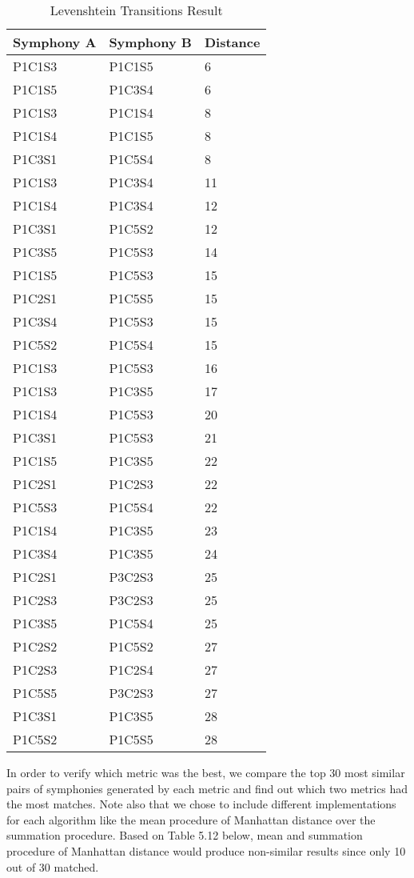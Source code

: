 \begin{longtable}{|l|l|l|}
\caption{Levenshtein Transitions Result}
\label{my-label}\\
\hline
Symphony A & Symphony B & Distance \\ \hline
\endfirsthead
%
\endhead
%
P1C1S3 & P1C1S5 & 6 \\ \hline
P1C1S5 & P1C3S4 & 6 \\ \hline
P1C1S3 & P1C1S4 & 8 \\ \hline
P1C1S4 & P1C1S5 & 8 \\ \hline
P1C3S1 & P1C5S4 & 8 \\ \hline
P1C1S3 & P1C3S4 & 11 \\ \hline
P1C1S4 & P1C3S4 & 12 \\ \hline
P1C3S1 & P1C5S2 & 12 \\ \hline
P1C3S5 & P1C5S3 & 14 \\ \hline
P1C1S5 & P1C5S3 & 15 \\ \hline
P1C2S1 & P1C5S5 & 15 \\ \hline
P1C3S4 & P1C5S3 & 15 \\ \hline
P1C5S2 & P1C5S4 & 15 \\ \hline
P1C1S3 & P1C5S3 & 16 \\ \hline
P1C1S3 & P1C3S5 & 17 \\ \hline
P1C1S4 & P1C5S3 & 20 \\ \hline
P1C3S1 & P1C5S3 & 21 \\ \hline
P1C1S5 & P1C3S5 & 22 \\ \hline
P1C2S1 & P1C2S3 & 22 \\ \hline
P1C5S3 & P1C5S4 & 22 \\ \hline
P1C1S4 & P1C3S5 & 23 \\ \hline
P1C3S4 & P1C3S5 & 24 \\ \hline
P1C2S1 & P3C2S3 & 25 \\ \hline
P1C2S3 & P3C2S3 & 25 \\ \hline
P1C3S5 & P1C5S4 & 25 \\ \hline
P1C2S2 & P1C5S2 & 27 \\ \hline
P1C2S3 & P1C2S4 & 27 \\ \hline
P1C5S5 & P3C2S3 & 27 \\ \hline
P1C3S1 & P1C3S5 & 28 \\ \hline
P1C5S2 & P1C5S5 & 28 \\ \hline
\end{longtable}

In order to verify which metric was the best, we compare the top 30 most similar pairs of symphonies generated by each metric and find out which two metrics had the most matches. Note also that we chose to include different implementations for each algorithm like the mean procedure of Manhattan distance over the summation procedure. Based on Table 5.12 below, mean and summation procedure of Manhattan distance would produce non-similar results since only 10 out of 30 matched. 


